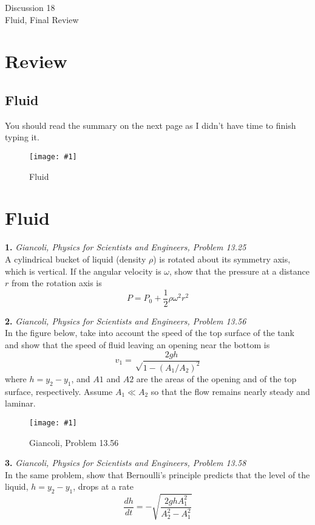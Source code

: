 \documentclass[11pt]{article}
\newcommand{\fig}[4]{
    \begin{figure}[H]
        \centering
        \texttt{[image: \#1]}
        \caption{#2}
        \label{exp4fit}
    \end{figure}
}
\theoremstyle{gangnamstyle}{\newtheorem{definition}{Definition}[]}
\theoremstyle{gangnamstyle}{\newtheorem{example}{Example}[]}
\theoremstyle{gangnamstyle}{\newtheorem{problem}{Problem}[]}
\begin{document}
\normalfont
\pagestyle{pages}


\begin{center}
\vspace{3in}
{\Large Discussion 18 } \\ [0.05in]
Fluid, Final Review \\ [-0.5in]
\end{center}

\section{Review}

\subsection{Fluid}

You should read the summary on the next page as I didn't have time to finish typing it. 

\fig{figs/0801/sum.png}{Fluid}{0.55}{0}

\pagebreak

\section{Fluid}

\textbf{1.} \textit{Giancoli, Physics for Scientists and Engineers, Problem 13.25} \\
A cylindrical bucket of liquid (density $\rho$) is rotated about its symmetry axis, which is vertical. If the angular velocity is $\omega$, show that the pressure at a distance $r$ from the rotation axis is
\[ P = P_0 + \frac{1}{2}\rho\omega^2r^2 \]

\pagebreak

\textbf{2.} \textit{Giancoli, Physics for Scientists and Engineers, Problem 13.56} \\
In the figure below, take into account the speed of the top surface of the tank and show that the speed of fluid leaving an opening near the bottom is 
\[ v_1 = \sqrt\frac{2gh}{1 - (A_1 / A_2)^2} \]
where $h = y_2 - y_1$, and $A1$ and $A2$ are the areas of the opening and of the top surface, respectively. Assume $A_1 \ll A_2$ so that the flow remains nearly steady and laminar.

\fig{figs/0801/tank.png}{Giancoli, Problem 13.56}{0.6}{0}

\pagebreak

\textbf{3.} \textit{Giancoli, Physics for Scientists and Engineers, Problem 13.58} \\
In the same problem, show that Bernoulli’s principle predicts that the level of the liquid, $h = y_2 - y_1$, drops at a rate
\[ \frac{dh}{dt} = -\sqrt{\frac{2ghA_1^2}{A_2^2 - A_1^2}} \]
\end{document}
